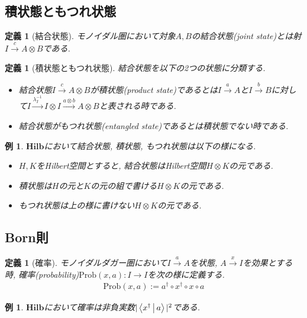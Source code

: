 \documentclass[a4paper,12pt]{ltjsarticle}
\theoremstyle{break}
\newtheorem{defn}[thm]{定義}
\newtheorem{eg}[thm]{例}
\newcommand{\hilb}{\mathbf{Hilb}}
\newcommand{\prob}{\mathrm{Prob}}
\newcommand{\xr}[1]{\xrightarrow{#1}}
\newcommand{\ci}{\circ}
\newcommand{\la}{\lambda}
\newcommand{\da}{\dagger}
\newcommand{\ot}{\otimes}
\numberwithin{equation}{section}
\begin{document}
\subsection{積状態ともつれ状態}

\begin{defn}[結合状態]
  モノイダル圏において対象$A,B$の結合状態(joint state)とは射$I \xr{c} A \ot B$である. 
\end{defn}  

\begin{defn}[積状態ともつれ状態]
  結合状態を以下の2つの状態に分類する. 
  \begin{itemize}
    \item 結合状態$I \xr{c} A \ot B$が積状態(product state)であるとは$I \xr{a} A$と$I \xr{b} B$に対して$I \xr{\la_I^{-1}} I \ot I \xr{a \ot b} A \ot B$と表される時である. 
    \item 結合状態がもつれ状態(entangled state)であるとは積状態でない時である.  
  \end{itemize}  
\end{defn}

\begin{eg}
  $\hilb$において結合状態, 積状態, もつれ状態は以下の様になる. 
  \begin{itemize}
    \item $H,K$をHilbert空間とすると, 結合状態はHilbert空間$H \ot K$の元である. 
    \item 積状態は$H$の元と$K$の元の組で書ける$H \ot K$の元である. 
    \item もつれ状態は上の様に書けない$H \ot K$の元である. 
  \end{itemize} 
\end{eg}

\subsection{Born則}

\begin{defn}[確率]
  モノイダルダガー圏において$I \xr{a} A$を状態, $A \xr{x} I$を効果とする時, 確率(probability)$\prob(x,a): I \to I$を次の様に定義する.
  \begin{align*}
    \prob(x,a) := a^\da \ci x^\da \ci x \ci a 
  \end{align*} 
\end{defn}

\begin{eg}
  $\hilb$において確率は非負実数$|\Braket{x^\da|a}|^2$である. 
\end{eg}
\end{document}
